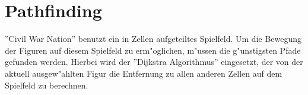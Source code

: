 \chapter{Pathfinding}
''Civil War Nation'' benutzt ein in Zellen aufgeteiltes Spielfeld. Um die Bewegung der Figuren auf diesem Spielfeld zu erm"oglichen, m"ussen die g"unstigsten Pfade gefunden werden. Hierbei wird der ''Dijkstra Algorithmus'' eingesetzt, der von der aktuell ausgew"ahlten Figur die Entfernung zu allen anderen Zellen auf dem Spielfeld zu berechnen. 